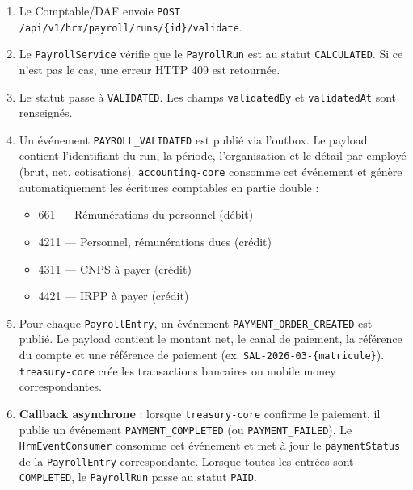 \documentclass[a4paper,12pt,openany]{book}
\begin{document}
    \begin{enumerate}
        \item Le Comptable/DAF envoie \texttt{POST /api/v1/hrm/payroll/runs/\{id\}/validate}.

        \item Le \texttt{PayrollService} vérifie que le \texttt{PayrollRun} est au statut \texttt{CALCULATED}. Si ce n'est pas le cas, une erreur HTTP 409 est retournée.

        \item Le statut passe à \texttt{VALIDATED}. Les champs \texttt{validatedBy} et \texttt{validatedAt} sont renseignés.

        \item Un événement \texttt{PAYROLL\_VALIDATED} est publié via l'outbox. Le payload contient l'identifiant du run, la période, l'organisation et le détail par employé (brut, net, cotisations). \texttt{accounting-core} consomme cet événement et génère automatiquement les écritures comptables en partie double :
        \begin{itemize}
            \item 661 — Rémunérations du personnel (débit)
            \item 4211 — Personnel, rémunérations dues (crédit)
            \item 4311 — CNPS à payer (crédit)
            \item 4421 — IRPP à payer (crédit)
        \end{itemize}

        \item Pour chaque \texttt{PayrollEntry}, un événement \texttt{PAYMENT\_ORDER\_CREATED} est publié. Le payload contient le montant net, le canal de paiement, la référence du compte et une référence de paiement (ex. \texttt{SAL-2026-03-\{matricule\}}). \texttt{treasury-core} crée les transactions bancaires ou mobile money correspondantes.

        \item \textbf{Callback asynchrone} : lorsque \texttt{treasury-core} confirme le paiement, il publie un événement \texttt{PAYMENT\_COMPLETED} (ou \texttt{PAYMENT\_FAILED}). Le \texttt{HrmEventConsumer} consomme cet événement et met à jour le \texttt{paymentStatus} de la \texttt{PayrollEntry} correspondante. Lorsque toutes les entrées sont \texttt{COMPLETED}, le \texttt{PayrollRun} passe au statut \texttt{PAID}.
    \end{enumerate}

\end{document}
